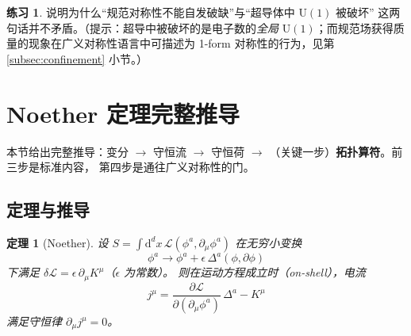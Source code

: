 \documentclass[UTF8,a4paper,11pt]{ctexart}
\theoremstyle{plain}
\newtheorem{theorem}{定理}[section]
\theoremstyle{definition}
\newtheorem{exercise}{练习}[section]
\theoremstyle{remark}
\newcommand{\ext}{\mathrm{d}}          %
\newcommand{\Uone}{\mathrm{U}(1)}
\newcommand{\Lag}{\mathcal{L}}
\newcommand{\PD}[2]{\frac{\partial #1}{\partial #2}}
\newcommand{\en}[1]{\textsf{#1}}       %
\begin{document}
\begin{exercise}
说明为什么“规范对称性不能自发破缺”与“超导体中 $\Uone$ 被破坏”
这两句话并不矛盾。（提示：超导中被破坏的是电子数的\emph{全局}
$\Uone$；而规范场获得质量的现象在广义对称性语言中可描述为
1-form 对称性的行为，见第 \ref{subsec:confinement} 小节。）
\end{exercise}

\section{Noether 定理完整推导}
\label{sec:noether}

本节给出完整推导：变分 $\to$ 守恒流 $\to$ 守恒荷 $\to$
（关键一步）\textbf{拓扑算符}。前三步是标准内容，
第四步是通往广义对称性的门。

\subsection{定理与推导}

\begin{theorem}[Noether]
\label{thm:noether}
设 $S=\int \ext^dx\,\Lag(\phi^a,\partial_\mu\phi^a)$ 在无穷小变换
\begin{equation}
  \phi^a\longrightarrow\phi^a+\epsilon\,\Delta^a(\phi,\partial\phi)
  \label{eq:infsym}
\end{equation}
下满足 $\delta\Lag=\epsilon\,\partial_\mu K^\mu$（$\epsilon$ 为常数）。
则在运动方程成立时（\en{on-shell}），电流
\begin{equation}
  \boxed{\ j^\mu=\PD{\Lag}{(\partial_\mu\phi^a)}\,\Delta^a-K^\mu\ }
  \label{eq:noethercurrent}
\end{equation}
满足守恒律 $\partial_\mu j^\mu=0$。
\end{theorem}
\end{document}
